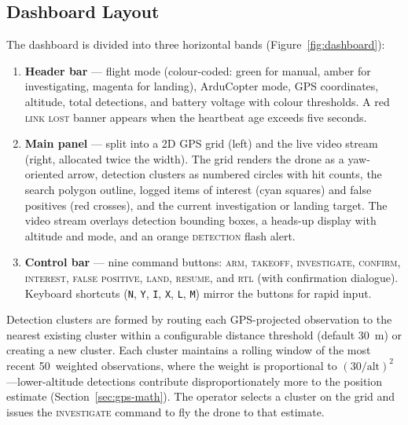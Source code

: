 \subsection{Dashboard Layout}\label{sec:gs-dashboard}

The dashboard is divided into three horizontal bands (Figure~\ref{fig:dashboard}):

\begin{enumerate}
  \item \textbf{Header bar} --- flight mode (colour-coded: green for manual, amber for investigating, magenta for landing), ArduCopter mode, GPS coordinates, altitude, total detections, and battery voltage with colour thresholds. A red \textsc{link lost} banner appears when the heartbeat age exceeds five seconds.
  \item \textbf{Main panel} --- split into a 2D GPS grid (left) and the live video stream (right, allocated twice the width). The grid renders the drone as a yaw-oriented arrow, detection clusters as numbered circles with hit counts, the search polygon outline, logged items of interest (cyan squares) and false positives (red crosses), and the current investigation or landing target. The video stream overlays detection bounding boxes, a heads-up display with altitude and mode, and an orange \textsc{detection} flash alert.
  \item \textbf{Control bar} --- nine command buttons: \textsc{arm}, \textsc{takeoff}, \textsc{investigate}, \textsc{confirm}, \textsc{interest}, \textsc{false positive}, \textsc{land}, \textsc{resume}, and \textsc{rtl} (with confirmation dialogue). Keyboard shortcuts (\texttt{N}, \texttt{Y}, \texttt{I}, \texttt{X}, \texttt{L}, \texttt{M}) mirror the buttons for rapid input.
\end{enumerate}

Detection clusters are formed by routing each GPS-projected observation to the nearest existing cluster within a configurable distance threshold (default 30~m) or creating a new cluster. Each cluster maintains a rolling window of the most recent 50~weighted observations, where the weight is proportional to $(30/\text{alt})^2$---lower-altitude detections contribute disproportionately more to the position estimate (Section~\ref{sec:gps-math}). The operator selects a cluster on the grid and issues the \textsc{investigate} command to fly the drone to that estimate.

